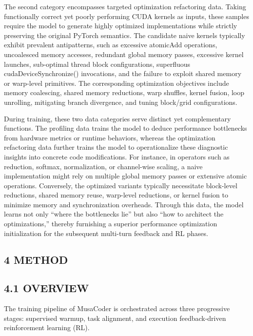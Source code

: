 \documentclass[
  10
]{article}
\begin{document}
The second category encompasses targeted optimization refactoring data.
Taking functionally correct yet poorly performing CUDA kernels as
inputs, these samples require the model to generate highly optimized
implementations while strictly preserving the original PyTorch
semantics. The candidate naive kernels typically exhibit prevalent
antipatterns, such as excessive atomicAdd operations, uncoalesced memory
accesses, redundant global memory passes, excessive kernel launches,
sub-optimal thread block configurations, superfluous
cudaDeviceSynchronize() invocations, and the failure to exploit shared
memory or warp-level primitives. The corresponding optimization
objectives include memory coalescing, shared memory reductions, warp
shuffles, kernel fusion, loop unrolling, mitigating branch divergence,
and tuning block/grid configurations.

During training, these two data categories serve distinct yet
complementary functions. The profiling data trains the model to deduce
performance bottlenecks from hardware metrics or runtime behaviors,
whereas the optimization refactoring data further trains the model to
operationalize these diagnostic insights into concrete code
modifications. For instance, in operators such as reduction, softmax,
normalization, or channel-wise scaling, a naive implementation might
rely on multiple global memory passes or extensive atomic operations.
Conversely, the optimized variants typically necessitate block-level
reductions, shared memory reuse, warp-level reductions, or kernel fusion
to minimize memory and synchronization overheads. Through this data, the
model learns not only ``where the bottlenecks lie'' but also ``how to
architect the optimizations,'' thereby furnishing a superior performance
optimization initialization for the subsequent multi-turn feedback and
RL phases.

\subsection{4 METHOD}\label{method}

\subsection{4.1 OVERVIEW}\label{overview}

The training pipeline of MusaCoder is orchestrated across three
progressive stages: supervised warmup, task alignment, and execution
feedback-driven reinforcement learning (RL).
\end{document}
